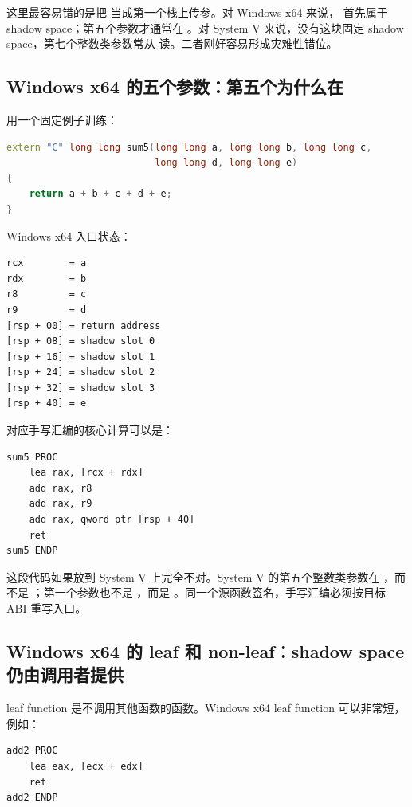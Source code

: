 这里最容易错的是把 \code{[rsp+8]} 当成第一个栈上传参。对 Windows x64 来说，\code{[rsp+8]} 首先属于 shadow space；第五个参数才通常在 \code{[rsp+40]}。对 System V 来说，没有这块固定 shadow space，第七个整数类参数常从 \code{[rsp+8]} 读。二者刚好容易形成灾难性错位。

\subsection{Windows x64 的五个参数：第五个为什么在 \code{[rsp+40]}}

用一个固定例子训练：

\begin{lstlisting}[language=C++]
extern "C" long long sum5(long long a, long long b, long long c,
                          long long d, long long e)
{
    return a + b + c + d + e;
}
\end{lstlisting}

Windows x64 入口状态：

\begin{lstlisting}[numbers=none,caption={sum5 的 Windows x64 入口状态}]
rcx        = a
rdx        = b
r8         = c
r9         = d
[rsp + 00] = return address
[rsp + 08] = shadow slot 0
[rsp + 16] = shadow slot 1
[rsp + 24] = shadow slot 2
[rsp + 32] = shadow slot 3
[rsp + 40] = e
\end{lstlisting}

对应手写汇编的核心计算可以是：

\begin{lstlisting}[numbers=none,caption={Windows x64 sum5 栈参数读取}]
sum5 PROC
    lea rax, [rcx + rdx]
    add rax, r8
    add rax, r9
    add rax, qword ptr [rsp + 40]
    ret
sum5 ENDP
\end{lstlisting}

这段代码如果放到 System V 上完全不对。System V 的第五个整数类参数在 ，而不是 \code{[rsp+40]}；第一个参数也不是 ，而是 。同一个源函数签名，手写汇编必须按目标 ABI 重写入口。

\subsection{Windows x64 的 leaf 和 non-leaf：shadow space 仍由调用者提供}

leaf function 是不调用其他函数的函数。Windows x64 leaf function 可以非常短，例如：

\begin{lstlisting}[numbers=none,caption={Windows x64 leaf function}]
add2 PROC
    lea eax, [ecx + edx]
    ret
add2 ENDP
\end{lstlisting}


